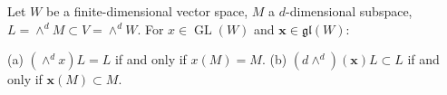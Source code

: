 Let $W$ be a finite-dimensional vector space, $M$ a $d$-dimensional subspace, $L = \wedge^d M \subset V = \wedge^d W$. For $x \in \operatorname{GL}(W)$ and $\mathbf{x} \in \mathfrak{gl}(W)$:

(a) $(\wedge^d x)L = L$ if and only if $x(M) = M$.
(b) $(d\wedge^d)(\mathbf{x})L \subset L$ if and only if $\mathbf{x}(M) \subset M$.
